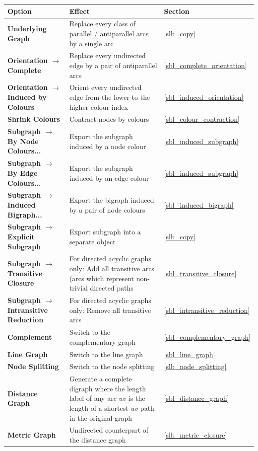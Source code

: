 \documentclass[a4paper,11pt,twoside]{book}
\begin{document}
\bigskip
\noindent
\begin{tabular}{p{7cm}|p{16.3cm}|p{1.5cm}} 
\large\bf Option &  \large\bf Effect & \large\bf Section \\
[1mm] \hline \hline
\bf Underlying Graph &
    Replace every class of parallel / antiparallel arcs by a single arc &
    \ref{slb_copy} \\ \hline
\bf Orientation $\rightarrow$ Complete &
    Replace every undirected edge by a pair of antiparallel arcs &
    \ref{sbl_complete_orientation} \\ \hline
\bf Orientation $\rightarrow$ Induced by Colours &
    Orient every undirected edge from the lower to the higher colour index &
    \ref{sbl_induced_orientation} \\ \hline
\bf Shrink Colours &
    Contract nodes by colours &
    \ref{sbl_colour_contraction} \\ \hline
\bf Subgraph $\rightarrow$ By Node Colours... &
    Export the subgraph induced by a node colour &
    \ref{sbl_induced_subgraph} \\ \hline
\bf Subgraph $\rightarrow$ By Edge Colours... &
    Export the subgraph induced by an edge colour &
    \ref{sbl_induced_subgraph} \\ \hline
\bf Subgraph $\rightarrow$ Induced Bigraph... &
    Export the bigraph induced by a pair of node colours &
    \ref{sbl_induced_bigraph} \\ \hline
\bf Subgraph $\rightarrow$ Explicit Subgraph &
    Export subgraph into a separate object &
    \ref{slb_copy} \\ \hline
\bf Subgraph $\rightarrow$ Transitive Closure &
    For directed acyclic graphs only: Add all transitive arcs
    (arcs which represent non-trivial directed paths &
    \ref{sbl_transitive_closure} \\ \hline
\bf Subgraph $\rightarrow$ Intransitive Reduction &
    For directed acyclic graphs only: Remove all transitive arcs &
    \ref{sbl_intransitive_reduction} \\ \hline
\bf Complement &
    Switch to the complementary graph &
    \ref{sbl_complementary_graph} \\ \hline
\bf Line Graph &
    Switch to the line graph &
    \ref{sbl_line_graph} \\ \hline
\bf Node Splitting &
    Switch to the node splitting &
    \ref{slb_node_splitting} \\ \hline
\bf Distance Graph &
    Generate a complete digraph where the length label of any arc
    $uv$ is the length of a shortest $uv$-path in the original graph &
    \ref{sbl_distance_graph} \\ \hline
\bf Metric Graph &
    Undirected counterpart of the distance graph &
    \ref{slb_metric_closure}
\end{tabular}
\end{document}

